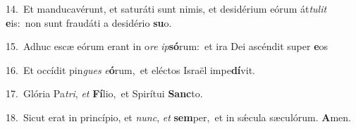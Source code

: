 {\numbfont\textcolor{\numbcolor}{14.}}~Et manducavérunt, et saturáti sunt nimis, et desidérium eórum át\-\textit{tu}\-\textit{lit} \textbf{e}\-is:~\star non sunt fraudáti a desidério \textbf{su}\-o.\par
{\numbfont\textcolor{\numbcolor}{15.}}~Adhuc escæ eórum erant in o\textit{re} \textit{ip}\-\textbf{só}rum:~\star et ira Dei ascéndit super \textbf{e}\-os\par
{\numbfont\textcolor{\numbcolor}{16.}}~Et occídit pin\textit{gues} \textit{e}\-\textbf{ó}rum,~\star et eléctos Israël impe\-\textbf{dí}\-vit.\par
{\numbfont\textcolor{\numbcolor}{17.}}~Glória Pa\-\textit{tri}\-, \textit{et} \textbf{Fí}\-lio,~\star et Spirítui \textbf{Sanc}\-to.\par
{\numbfont\textcolor{\numbcolor}{18.}}~Sicut erat in princípio, et \textit{nunc}\-, \textit{et} \textbf{sem}\-per,~\star et in sǽcula sæculórum. \textbf{A}\-men.\par
